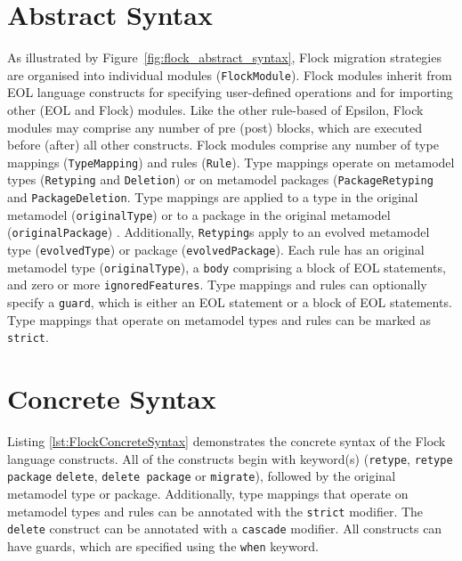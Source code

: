 \section{Abstract Syntax}

As illustrated by Figure~\ref{fig:flock_abstract_syntax}, Flock migration strategies are organised into individual modules (\texttt{Flo\-ckMo\-du\-le}). Flock modules inherit from EOL language constructs for specifying user-defined operations and for importing other (EOL and Flock) modules. Like the other rule-based of Epsilon, Flock modules may comprise any number of pre (post) blocks, which are executed before (after) all other constructs. Flock modules comprise any number of type mappings (\texttt{Ty\-peMa\-pp\-i\-ng}) and rules (\texttt{Ru\-le}). Type mappings operate on metamodel types (\texttt{Rety\-pi\-ng} and \texttt{De\-le\-ti\-on}) or on metamodel packages (\texttt{Pa\-ck\-a\-geRety\-pi\-ng} and \texttt{Pa\-ck\-a\-geDe\-le\-ti\-on}. Type mappings are applied to a type in the original metamodel (\texttt{or\-ig\-in\-alTy\-pe}) or to a package in the original metamodel (\texttt{or\-ig\-in\-alPa\-ck\-a\-ge}) . Additionally, \texttt{Rety\-pi\-ng}s apply to an evolved metamodel type (\texttt{ev\-ol\-vedTy\-pe}) or package (\texttt{ev\-ol\-vedPa\-ck\-a\-ge}). Each rule has an original metamodel type (\texttt{or\-ig\-in\-alTy\-pe}), a \texttt{bo\-dy} comprising a block of EOL statements, and zero or more \texttt{ig\-no\-r\-edFe\-at\-ur\-es}. Type mappings and rules can optionally specify a \texttt{gu\-ard}, which is either an EOL statement or a block of EOL statements. Type mappings that operate on metamodel types and rules can be marked as \texttt{str\-ict}.

\section{Concrete Syntax}

Listing \ref{lst:FlockConcreteSyntax} demonstrates the concrete syntax of the Flock language constructs. All of the constructs begin with keyword(s) (\texttt{retype}, \texttt{retype package} \texttt{delete}, \texttt{delete package} or \texttt{migrate}), followed by the original metamodel type or package. Additionally, type mappings that operate on metamodel types and rules can be annotated with the \texttt{strict} modifier. The \texttt{delete} construct can be annotated with a \texttt{cascade} modifier. All constructs can have guards, which are specified using the \texttt{when} keyword.

